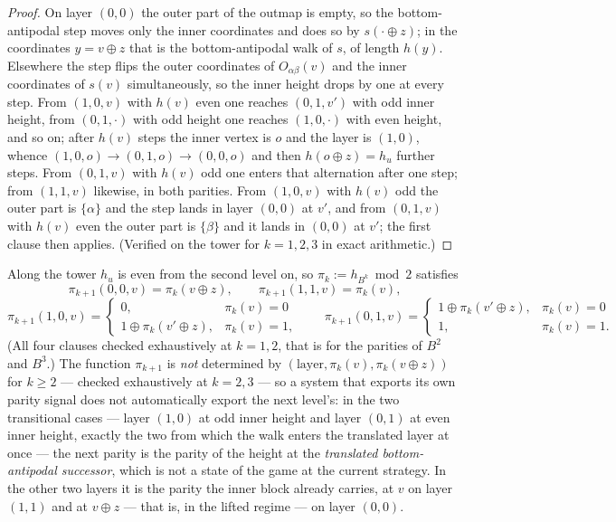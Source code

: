 \begin{proof}
On layer $(0,0)$ the outer part of the outmap is empty, so the
bottom-antipodal step moves only the inner coordinates and does so by
$s(\cdot\oplus z)$; in the coordinates $y=v\oplus z$ that is the
bottom-antipodal walk of $s$, of length $h(y)$.  Elsewhere the step flips the
outer coordinates of $O_{\alpha\beta}(v)$ and the inner coordinates of $s(v)$
simultaneously, so the inner height drops by one at every step.  From
$(1,0,v)$ with $h(v)$ even one reaches $(0,1,v')$ with odd inner height, from
$(0,1,\cdot)$ with odd height one reaches $(1,0,\cdot)$ with even height, and
so on; after $h(v)$ steps the inner vertex is $o$ and the layer is $(1,0)$,
whence $(1,0,o)\to(0,1,o)\to(0,0,o)$ and then $h(o\oplus z)=h_u$ further
steps.  From $(0,1,v)$ with $h(v)$ odd one enters that alternation after one
step; from $(1,1,v)$ likewise, in both parities.  From $(1,0,v)$ with $h(v)$
odd the outer part is $\{\alpha\}$ and the step lands in layer $(0,0)$ at
$v'$, and from $(0,1,v)$ with $h(v)$ even the outer part is $\{\beta\}$ and it
lands in $(0,0)$ at $v'$; the first clause then applies.  (Verified on the
tower for $k=1,2,3$ in exact arithmetic.)
\end{proof}

\begin{corollary}
\label{lvl:parity-nonlocal}
Along the tower $h_u$ is even from the second level on, so
$\pi_{k}:=h_{B^{k}}\bmod2$ satisfies
\[
 \pi_{k+1}(0,0,v)=\pi_k(v\oplus z),\qquad
 \pi_{k+1}(1,1,v)=\pi_k(v),
\]
\[
 \pi_{k+1}(1,0,v)=\begin{cases}0,&\pi_k(v)=0\\
   1\oplus\pi_k(v'\oplus z),&\pi_k(v)=1,\end{cases}
 \qquad
 \pi_{k+1}(0,1,v)=\begin{cases}1\oplus\pi_k(v'\oplus z),&\pi_k(v)=0\\
   1,&\pi_k(v)=1.\end{cases}
\]
(All four clauses checked exhaustively at $k=1,2$, that is for the parities of
$B^{2}$ and $B^{3}$.)  The
function $\pi_{k+1}$ is \emph{not} determined by
$(\text{layer},\pi_k(v),\pi_k(v\oplus z))$ for $k\ge2$ --- checked
exhaustively at $k=2,3$ --- so a system that exports its own parity signal
does not automatically export the next level's: in the two transitional cases
--- layer $(1,0)$ at odd inner height and layer $(0,1)$ at even inner height,
exactly the two from which the walk enters the translated layer at once --- the
next parity is the parity of the height at the \emph{translated
bottom-antipodal successor}, which is not a state of the game at the current
strategy.  In the other two layers it is the parity the inner block already
carries, at $v$ on layer $(1,1)$ and at $v\oplus z$ --- that is, in the lifted
regime --- on layer $(0,0)$.
\end{corollary}

